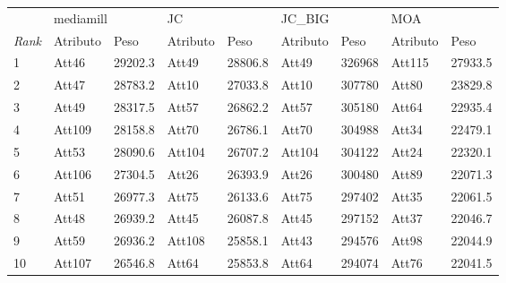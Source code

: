 \begin{tabular}{lllllllll}
	\toprule
	{}            & \multicolumn{2}{l}{mediamill} & \multicolumn{2}{l}{JC} & \multicolumn{2}{l}{JC\_BIG} & \multicolumn{2}{l}{MOA}                                          \\
	\textit{Rank} & Atributo                      & Peso                   & Atributo                    & Peso                    & Atributo & Peso   & Atributo & Peso    \\
	\midrule
	1             & Att46                         & 29202.3                & Att49                       & 28806.8                 & Att49    & 326968 & Att115   & 27933.5 \\[3pt]
	2             & Att47                         & 28783.2                & Att10                       & 27033.8                 & Att10    & 307780 & Att80    & 23829.8 \\[3pt]
	3             & Att49                         & 28317.5                & Att57                       & 26862.2                 & Att57    & 305180 & Att64    & 22935.4 \\[3pt]
	4             & Att109                        & 28158.8                & Att70                       & 26786.1                 & Att70    & 304988 & Att34    & 22479.1 \\[3pt]
	5             & Att53                         & 28090.6                & Att104                      & 26707.2                 & Att104   & 304122 & Att24    & 22320.1 \\[3pt]
	6             & Att106                        & 27304.5                & Att26                       & 26393.9                 & Att26    & 300480 & Att89    & 22071.3 \\[3pt]
	7             & Att51                         & 26977.3                & Att75                       & 26133.6                 & Att75    & 297402 & Att35    & 22061.5 \\[3pt]
	8             & Att48                         & 26939.2                & Att45                       & 26087.8                 & Att45    & 297152 & Att37    & 22046.7 \\[3pt]
	9             & Att59                         & 26936.2                & Att108                      & 25858.1                 & Att43    & 294576 & Att98    & 22044.9 \\[3pt]
	10            & Att107                        & 26546.8                & Att64                       & 25853.8                 & Att64    & 294074 & Att76    & 22041.5 \\
	\bottomrule
\end{tabular}
